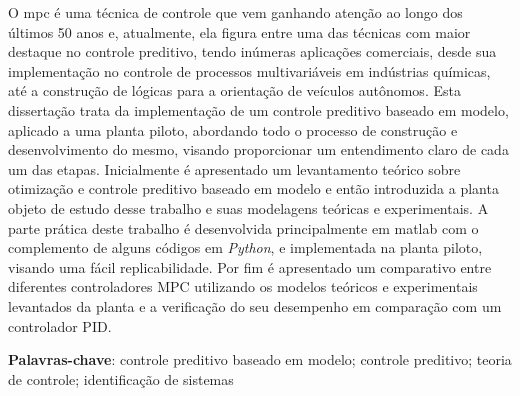 
\setlength{\absparsep}{18pt} %
\begin{resumo}
    O \acrshort{mpc} é uma técnica de controle que vem ganhando atenção
    ao longo dos últimos 50 anos e, atualmente, ela figura entre uma das técnicas
    com maior destaque no controle preditivo, tendo inúmeras aplicações comerciais,
    desde sua implementação no controle de processos multivariáveis em indústrias químicas,
    até a construção de lógicas para a orientação de veículos autônomos. Esta dissertação
    trata da implementação de um controle preditivo baseado em modelo,
    aplicado a uma planta piloto, abordando todo o processo de construção e desenvolvimento
    do mesmo, visando proporcionar um entendimento claro de cada um das etapas. Inicialmente
    é apresentado um levantamento teórico sobre otimização e controle preditivo baseado em
    modelo e então introduzida a planta objeto de estudo desse trabalho e suas modelagens teóricas e
    experimentais. A parte prática deste trabalho é desenvolvida principalmente em \acrshort{matlab}
    com o complemento de alguns códigos em \textit{Python}, e implementada na planta piloto, visando
    uma fácil replicabilidade. Por fim é apresentado um comparativo entre diferentes controladores MPC
    utilizando os modelos teóricos e experimentais levantados da planta e a verificação do
    seu desempenho em comparação com um controlador PID.
    
    \vspace{\onelineskip}

    \noindent 
    \textbf{Palavras-chave}: controle preditivo baseado em modelo; controle preditivo; teoria de controle; identificação de sistemas
\end{resumo}